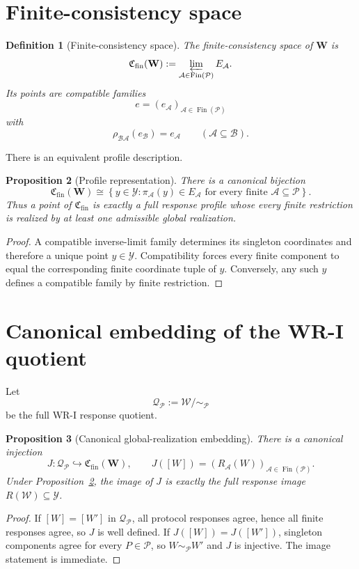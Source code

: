 \documentclass[11pt]{article}
\newtheorem{definition}{Definition}[section]
\newtheorem{proposition}[definition]{Proposition}
\newcommand{\W}{\mathcal W}
\newcommand{\Pcal}{\mathcal P}
\newcommand{\Acal}{\mathcal A}
\newcommand{\Bcal}{\mathcal B}
\newcommand{\Y}{\mathcal Y}
\newcommand{\Fin}{\operatorname{Fin}}
\newcommand{\Cfin}{\mathfrak C_{\mathrm{fin}}}
\begin{document}
\section{Finite-consistency space}

\begin{definition}[Finite-consistency space]
The \emph{finite-consistency space} of $\mathbf W$ is
\[
\Cfin(\mathbf W)
:=
\varprojlim_{\Acal\in\Fin(\Pcal)}E_{\Acal}.
\]
Its points are compatible families
\[
e=(e_{\Acal})_{\Acal\in\Fin(\Pcal)}
\]
with
\[
\rho_{\Bcal\Acal}(e_{\Bcal})=e_{\Acal}
\qquad
(\Acal\subseteq\Bcal).
\]
\end{definition}

There is an equivalent profile description.

\begin{proposition}[Profile representation]\label{prop:profile-representation}
There is a canonical bijection
\[
\Cfin(\mathbf W)
\cong
\left\{
y\in\Y:
\pi_{\Acal}(y)\in E_{\Acal}
\text{ for every finite }\Acal\subseteq\Pcal
\right\}.
\]
Thus a point of $\Cfin$ is exactly a full response profile whose every finite
restriction is realized by at least one admissible global realization.
\end{proposition}

\begin{proof}
A compatible inverse-limit family determines its singleton coordinates and
therefore a unique point $y\in\Y$. Compatibility forces every finite component
to equal the corresponding finite coordinate tuple of $y$. Conversely, any
such $y$ defines a compatible family by finite restriction.
\end{proof}

\section{Canonical embedding of the WR-I quotient}

Let
\[
\mathcal Q_{\Pcal}:=\W/\!\sim_{\Pcal}
\]
be the full WR-I response quotient.

\begin{proposition}[Canonical global-realization embedding]
There is a canonical injection
\[
J:\mathcal Q_{\Pcal}\hookrightarrow\Cfin(\mathbf W),
\qquad
J([W])=(R_{\Acal}(W))_{\Acal\in\Fin(\Pcal)}.
\]
Under Proposition~\ref{prop:profile-representation}, the image of $J$ is
exactly the full response image $R(\W)\subseteq\Y$.
\end{proposition}

\begin{proof}
If $[W]=[W']$ in $\mathcal Q_{\Pcal}$, all protocol responses agree, hence all
finite responses agree, so $J$ is well defined. If $J([W])=J([W'])$, singleton
components agree for every $P\in\Pcal$, so $W\sim_{\Pcal}W'$ and $J$ is
injective. The image statement is immediate.
\end{proof}
\end{document}
